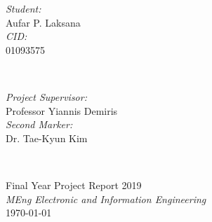\begin{titlepage}
\begin{minipage}{0.4\textwidth}
\begin{flushleft} \large
\emph{Student:}\\
Aufar P. Laksana%
\\[1.2em]
\emph{CID:}\\
01093575
\end{flushleft}
\end{minipage}
~
\begin{minipage}{0.4\textwidth}
\begin{flushright} \large
\emph{Project Supervisor:} \\
Professor Yiannis Demiris
\\[1.2em] %
\emph{Second Marker:} \\
Dr. Tae-Kyun Kim %
\end{flushright}
\end{minipage}\\[3cm]
\makeatother



{\large Final Year Project Report 2019}\\[0.5cm]
{\large \emph{MEng Electronic and Information Engineering}}\\[0.5cm]
{\large \today}\\[2cm] %

\vfill %

\end{titlepage}